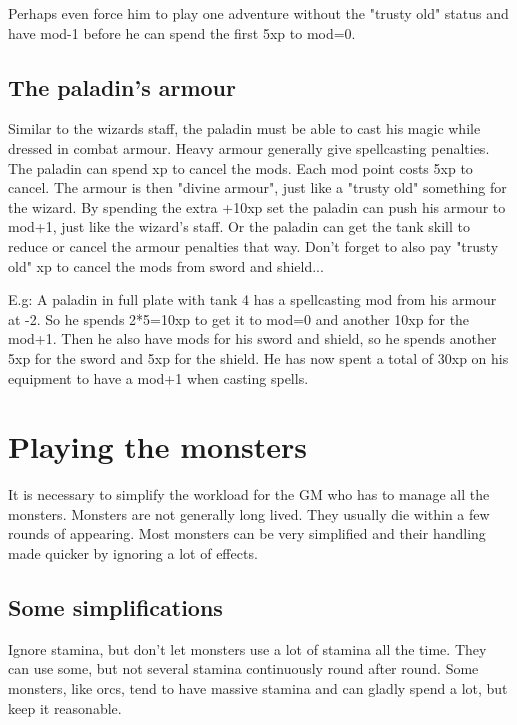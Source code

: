 Perhaps even force him to play one adventure without the "trusty old" status and have mod-1 before he can spend the first 5xp to mod=0.


\subsection*{The paladin's armour}
Similar to the wizards staff, the paladin must be able to cast his magic while dressed in combat armour. Heavy armour generally give spellcasting penalties. The paladin can spend xp to cancel the mods. Each mod point costs 5xp to cancel. The armour is then "divine armour", just like a "trusty old" something for the wizard. By spending the extra +10xp set the paladin can push his armour to mod+1, just like the wizard's staff. 
Or the paladin can get the tank skill to reduce or cancel the armour penalties that way.
Don't forget to also pay "trusty old" xp to cancel the mods from sword and shield...

E.g: A paladin in full plate with tank 4 has a spellcasting mod from his armour at -2. So he spends 2*5=10xp to get it to mod=0 and another 10xp for the mod+1. Then he also have mods for his sword and shield, so he spends another 5xp for the sword and 5xp for the shield. He has now spent a total of 30xp on his equipment to have a mod+1 when casting spells.












\section*{Playing the monsters}
It is necessary to simplify the workload for the GM who has to manage all the monsters. Monsters are not generally long lived. They usually die within a few rounds of appearing. Most monsters can be very simplified and their handling made quicker by ignoring a lot of effects.


\subsection*{Some simplifications}
Ignore stamina, but don't let monsters use a lot of stamina all the time. They can use some, but not several stamina continuously round after round. Some monsters, like orcs, tend to have massive stamina and can gladly spend a lot, but keep it reasonable.

